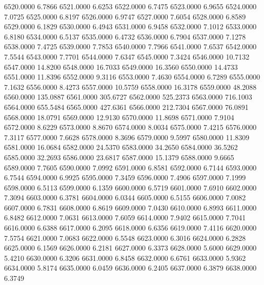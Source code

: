 6520.0000      6.7866
6521.0000      6.6253
6522.0000      6.7475
6523.0000      6.9655
6524.0000      7.0725
6525.0000      6.8197
6526.0000      6.9747
6527.0000      7.6054
6528.0000      6.8589
6529.0000      6.1829
6530.0000      6.4943
6531.0000      6.9458
6532.0000      7.1012
6533.0000      6.8180
6534.0000      6.5137
6535.0000      6.4732
6536.0000      6.7904
6537.0000      7.1278
6538.0000      7.4725
6539.0000      7.7853
6540.0000      7.7966
6541.0000      7.6537
6542.0000      7.5544
6543.0000      7.7701
6544.0000      7.6347
6545.0000      7.3424
6546.0000     10.7132
6547.0000     14.8200
6548.0000     16.7033
6549.0000     16.3560
6550.0000     14.4733
6551.0000     11.8396
6552.0000      9.3116
6553.0000      7.4630
6554.0000      6.7289
6555.0000      7.1632
6556.0000      8.4273
6557.0000     10.5759
6558.0000     16.3178
6559.0000     48.2088
6560.0000    135.0887
6561.0000    305.6727
6562.0000    525.2373
6563.0000    716.1003
6564.0000    655.5484
6565.0000    427.6361
6566.0000    212.7304
6567.0000     76.0891
6568.0000     18.0791
6569.0000     12.9130
6570.0000     11.8698
6571.0000      7.9104
6572.0000      8.6229
6573.0000      8.8670
6574.0000      8.0034
6575.0000      7.4215
6576.0000      7.3117
6577.0000      7.6628
6578.0000      8.3696
6579.0000      9.5997
6580.0000     11.8309
6581.0000     16.0684
6582.0000     24.5370
6583.0000     34.2650
6584.0000     36.5262
6585.0000     32.2693
6586.0000     23.6817
6587.0000     15.1379
6588.0000      9.6665
6589.0000      7.7605
6590.0000      7.0992
6591.0000      6.8581
6592.0000      6.7144
6593.0000      6.7544
6594.0000      6.9925
6595.0000      7.3459
6596.0000      7.4906
6597.0000      7.1999
6598.0000      6.5113
6599.0000      6.1359
6600.0000      6.5719
6601.0000      7.6910
6602.0000      7.3094
6603.0000      6.3781
6604.0000      6.0344
6605.0000      6.5155
6606.0000      7.0082
6607.0000      6.7831
6608.0000      6.8619
6609.0000      7.0430
6610.0000      6.8993
6611.0000      6.8482
6612.0000      7.0631
6613.0000      7.6059
6614.0000      7.9402
6615.0000      7.7041
6616.0000      6.6388
6617.0000      6.2095
6618.0000      6.6356
6619.0000      7.4116
6620.0000      7.5754
6621.0000      7.0683
6622.0000      6.5548
6623.0000      6.3016
6624.0000      6.2828
6625.0000      6.1569
6626.0000      6.2181
6627.0000      6.3373
6628.0000      5.6000
6629.0000      5.4210
6630.0000      6.3206
6631.0000      6.8458
6632.0000      6.6761
6633.0000      5.9362
6634.0000      5.8174
6635.0000      6.0459
6636.0000      6.2405
6637.0000      6.3879
6638.0000      6.3749
